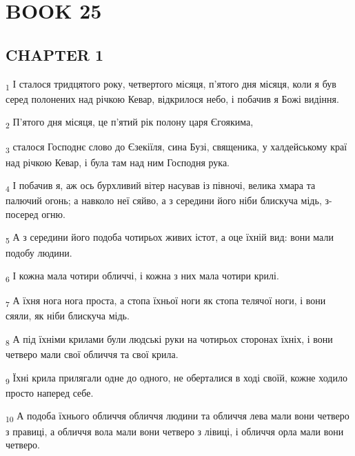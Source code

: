 \section{BOOK 25}
\subsection{CHAPTER 1}
\begin{tcolorbox}
\textsubscript{1} І сталося тридцятого року, четвертого місяця, п'ятого дня місяця, коли я був серед полонених над річкою Кевар, відкрилося небо, і побачив я Божі видіння.
\end{tcolorbox}
\begin{tcolorbox}
\textsubscript{2} П'ятого дня місяця, це п'ятий рік полону царя Єгоякима,
\end{tcolorbox}
\begin{tcolorbox}
\textsubscript{3} сталося Господнє слово до Єзекіїля, сина Бузі, священика, у халдейському краї над річкою Кевар, і була там над ним Господня рука.
\end{tcolorbox}
\begin{tcolorbox}
\textsubscript{4} І побачив я, аж ось бурхливий вітер насував із півночі, велика хмара та палючий огонь; а навколо неї сяйво, а з середини його ніби блискуча мідь, з-посеред огню.
\end{tcolorbox}
\begin{tcolorbox}
\textsubscript{5} А з середини його подоба чотирьох живих істот, а оце їхній вид: вони мали подобу людини.
\end{tcolorbox}
\begin{tcolorbox}
\textsubscript{6} І кожна мала чотири обличчі, і кожна з них мала чотири крилі.
\end{tcolorbox}
\begin{tcolorbox}
\textsubscript{7} А їхня нога нога проста, а стопа їхньої ноги як стопа телячої ноги, і вони сяяли, як ніби блискуча мідь.
\end{tcolorbox}
\begin{tcolorbox}
\textsubscript{8} А під їхніми крилами були людські руки на чотирьох сторонах їхніх, і вони четверо мали свої обличчя та свої крила.
\end{tcolorbox}
\begin{tcolorbox}
\textsubscript{9} Їхні крила прилягали одне до одного, не оберталися в ході своїй, кожне ходило просто наперед себе.
\end{tcolorbox}
\begin{tcolorbox}
\textsubscript{10} А подоба їхнього обличчя обличчя людини та обличчя лева мали вони четверо з правиці, а обличчя вола мали вони четверо з лівиці, і обличчя орла мали вони четверо.
\end{tcolorbox}
